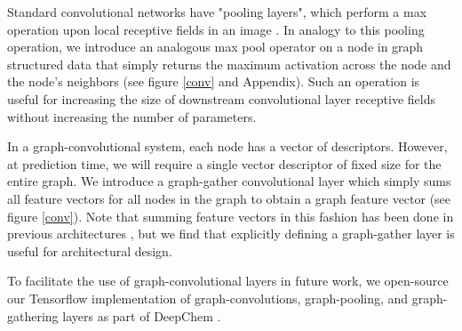 \documentclass[journal=jacsat,manuscript=article]{achemso}
\begin{document}
Standard convolutional networks have "pooling layers", which perform a max operation upon local receptive fields in an image \cite{karpathy231n}. In analogy to this pooling operation, we introduce an analogous max pool operator on a node in graph structured data that simply returns the maximum activation across the node and the node's neighbors (see figure \ref{conv} and Appendix). Such an operation is useful for increasing the size of downstream convolutional layer receptive fields without increasing the number of parameters.

In a graph-convolutional system, each node has a vector of descriptors. However, at prediction time, we will require a single vector descriptor of fixed size for the entire graph. We introduce a graph-gather convolutional layer which simply sums all feature vectors for all nodes in the graph to obtain a graph feature vector (see figure \ref{conv}). Note that summing feature vectors in this fashion has been done in previous architectures \cite{duvenaud2015convolutional}, but we find that explicitly defining a graph-gather layer is useful for architectural design.


To facilitate the use of graph-convolutional layers in future work, we open-source our Tensorflow\cite{abadi2016tensorflow} implementation of graph-convolutions, graph-pooling, and graph-gathering layers as part of DeepChem \cite{ram2016}.
\end{document}

